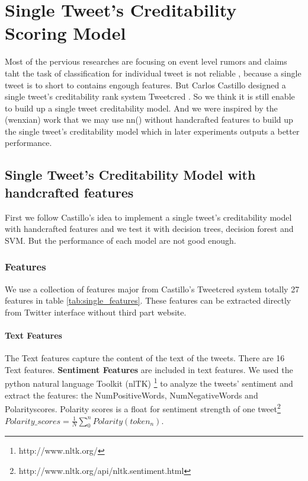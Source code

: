 \chapter{Single Tweet's Creditability Scoring Model} %
\label{cha:single_tweet_creditbility_scoring_model}
Most of the pervious researches are focusing on event level rumors and claims taht the task of classification for individual tweet is not reliable \cite{liu2015real} \cite{ma2015detect} \cite{zhao2015enquiring}, because a single tweet is to short to contains engough features. But Carlos Castillo designed a single tweet's creditability rank system Tweetcred \cite{gupta2014tweetcred}. So we think it is still enable to build up a single tweet creditability model. And we were inspired by the (wenxian) work that we may use nn() without handcrafted features to build up the single tweet's creditability model which in later experiments outputs a better performance.   
\section{Single Tweet's Creditability Model with handcrafted features} %
First we follow Castillo's \cite{gupta2014tweetcred} idea to implement a single tweet's creditability model with handcrafted features and we test it with decision trees, decision forest and SVM. But the performance of each model are not good enough. 

\subsection{Features}
We use a collection of features major from  Castillo's Tweetcred system\cite{gupta2014tweetcred} totally 27 features in table \ref{tab:single_features}. These features can be extracted directly from Twitter interface without third part website. 
\subsubsection{Text Features}
The Text features capture the content of the text of the tweets. There are 16 Text features. 
\textbf{Sentiment Features} are included in text features.
We used the python natural language Toolkit (nlTK) \footnote{http://www.nltk.org/} to analyze the tweets' sentiment and extract the features: the NumPositiveWords, NumNegativeWords and Polarityscores. Polarity scores is a float for sentiment strength of one tweet\footnote{http://www.nltk.org/api/nltk.sentiment.html} $Polarity\_scores = \frac {1}{N}    \sum_{0}^{n} {Polarity(token_n)}$.

